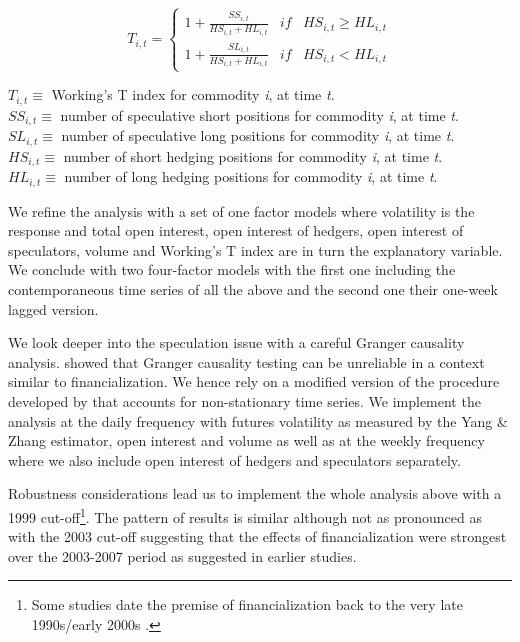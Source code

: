 \documentclass[12pt,]{article}
\let\rmarkdownfootnote\footnote%
\def\footnote{\protect\rmarkdownfootnote}
\begin{document}
\[
T_{i, t} =
\left\{\begin{matrix}
1+\frac{SS_{i, t}}{HS_{i, t}+HL_{i, t}} & if & HS_{i, t} \geq HL_{i, t}\\ 
1+\frac{SL_{i, t}}{HS_{i, t}+HL_{i, t}} & if & HS_{i, t} < HL_{i, t}
\end{matrix}\right.
\]

\(T_{i, t}\equiv\) Working's T index for commodity \textit{i}, at time
\textit{t}.\\
\(SS_{i, t}\equiv\) number of speculative short positions for commodity
\textit{i}, at time \textit{t}.\\
\(SL_{i, t}\equiv\) number of speculative long positions for commodity
\textit{i}, at time \textit{t}.\\
\(HS_{i, t}\equiv\) number of short hedging positions for commodity
\textit{i}, at time \textit{t}.\\
\(HL_{i, t}\equiv\) number of long hedging positions for commodity
\textit{i}, at time \textit{t}.

We refine the analysis with a set of one factor models where volatility
is the response and total open interest, open interest of hedgers, open
interest of speculators, volume and Working's T index are in turn the
explanatory variable. We conclude with two four-factor models with the
first one including the contemporaneous time series of all the above and
the second one their one-week lagged version.

We look deeper into the speculation issue with a careful Granger
causality analysis. \citet{phillips_testing_1990} showed that Granger
causality testing can be unreliable in a context similar to
financialization. We hence rely on a modified version of the procedure
developed by \citet{toda_statistical_1995} that accounts for
non-stationary time series. We implement the analysis at the daily
frequency with futures volatility as measured by the Yang \& Zhang
estimator, open interest and volume as well as at the weekly frequency
where we also include open interest of hedgers and speculators
separately.

Robustness considerations lead us to implement the whole analysis above
with a 1999 cut-off\footnote{Some studies date the premise of
  financialization back to the very late 1990s/early 2000s
  \citep[\citet{stoll_commodity_2010},
  \citet{buyuksahin_speculators_2014}]{bohl_does_2013}.}. The pattern of
results is similar although not as pronounced as with the 2003 cut-off
suggesting that the effects of financialization were strongest over the
2003-2007 period as suggested in earlier studies.
\end{document}
